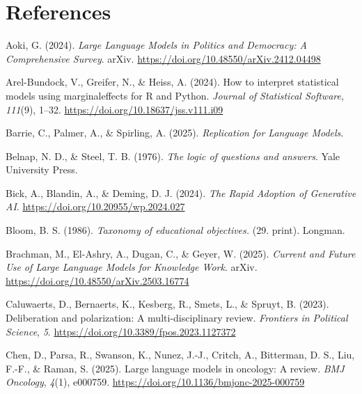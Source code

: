 \documentclass[
  12pt,
]{article}
\newlength{\cslhangindent}
\newenvironment{CSLReferences}[2] %
 {\begin{list}{}{%
  \setlength{\itemindent}{0pt}
  \setlength{\leftmargin}{0pt}
  \setlength{\parsep}{0pt}
  \ifodd #1
   \setlength{\leftmargin}{\cslhangindent}
   \setlength{\itemindent}{-1\cslhangindent}
  \fi
  \setlength{\itemsep}{#2\baselineskip}}}
 {\end{list}}
\begin{document}
\clearpage

\section*{References}\label{references}

\label{refs}
\begin{CSLReferences}{1}{0}
Aoki, G. (2024). \emph{Large {Language} {Models} in {Politics} and {Democracy}: {A} {Comprehensive} {Survey}}. arXiv. \url{https://doi.org/10.48550/arXiv.2412.04498}

Arel-Bundock, V., Greifer, N., \& Heiss, A. (2024). How to interpret statistical models using {marginaleffects} for {R} and {Python}. \emph{Journal of Statistical Software}, \emph{111}(9), 1--32. \url{https://doi.org/10.18637/jss.v111.i09}

Barrie, C., Palmer, A., \& Spirling, A. (2025). \emph{Replication for {Language} {Models}}.

Belnap, N. D., \& Steel, T. B. (1976). \emph{The logic of questions and answers}. Yale University Press.

Bick, A., Blandin, A., \& Deming, D. J. (2024). \emph{The {Rapid} {Adoption} of {Generative} {AI}}. \url{https://doi.org/10.20955/wp.2024.027}

Bloom, B. S. (1986). \emph{Taxonomy of educational objectives.} (29. print). Longman.

Brachman, M., El-Ashry, A., Dugan, C., \& Geyer, W. (2025). \emph{Current and {Future} {Use} of {Large} {Language} {Models} for {Knowledge} {Work}}. arXiv. \url{https://doi.org/10.48550/arXiv.2503.16774}

Caluwaerts, D., Bernaerts, K., Kesberg, R., Smets, L., \& Spruyt, B. (2023). Deliberation and polarization: A multi-disciplinary review. \emph{Frontiers in Political Science}, \emph{5}. \url{https://doi.org/10.3389/fpos.2023.1127372}

Chen, D., Parsa, R., Swanson, K., Nunez, J.-J., Critch, A., Bitterman, D. S., Liu, F.-F., \& Raman, S. (2025). Large language models in oncology: A review. \emph{BMJ Oncology}, \emph{4}(1), e000759. \url{https://doi.org/10.1136/bmjonc-2025-000759}


\end{CSLReferences}
\end{document}
